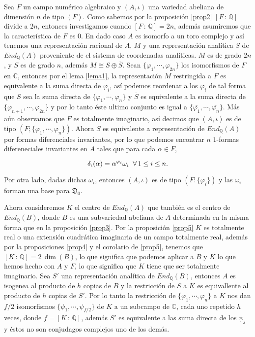 \documentclass[letterpaper]{report}
\newcommand{\rac}{\ensuremath{ \mathbb Q }}
\newcommand{\co}{\ensuremath{\mathbb C }}
\begin{document}
Sea $F$ un campo numérico algebraico y $(A,\iota)$ una variedad abeliana de dimensión $n$ de tipo $(F)$. Como sabemos por la proposición \ref{prop2} $[F\,:\,\rac]$ divide a $2n$, entonces investigamos cuando $[F\,:\,\rac]=2n$, además asumiremos que la característica de $F$ es $0$. En dado caso $A$ es isomorfo a un toro complejo y así tenemos una representación racional de $A$, $M$ y una representación analítica $S$ de $End_{\rac}(A)$ proveniente de el sistema de coordenadas analíticas. $M$ es de grado $2n$, y $S$ es de grado $n$, además $M\cong S\oplus\overline{S}$.
Sean \hbox{$\lbrace\varphi_1,\cdots,\varphi_{2n}\rbrace$} los isomorfismos de $F$ en $\co$, entonces por el lema \ref{lema1}, la representación $M$ restringida a $F$ es equivalente a la suma directa de $\varphi_i$, así podemos reordenar a los $\varphi_i$ de tal forma que $S$ sea la suma directa de \hbox{$\lbrace\varphi_1,\cdots,\varphi_{n}\rbrace$} y $\overline{S}$ es equivalente a la suma directa de \hbox{$\lbrace\varphi_{n+1},\cdots,\varphi_{2n}\rbrace$} y por lo tanto éste ultimo conjunto es igual a \hbox{$\lbrace\overline{\varphi_1},\cdots,\overline{\varphi_{n}}\rbrace$}. Más aún observamos que $F$ es totalmente imaginario, así decimos que $(A,\iota)$ es de tipo \hbox{$(F; \lbrace\varphi_1,\cdots,\varphi_{n}\rbrace)$}. Ahora $S$ es equivalente a representación de $End_{\rac}(A)$ por formas diferenciales invariantes, por lo que podemos encontrar $n$ $1$-formas difereneciales invariantes en $A$ tales que para cada $\alpha\in F$,

$$\delta_{\iota}(\alpha)=\alpha^{\varphi_i}\omega_i\hspace{0.2cm}\forall\,1\leq i\leq n.$$

Por otra lado, dadas dichas $\omega_i$, entonces $(A,\iota)$ es de tipo $(F:\lbrace \varphi_i\rbrace)$ y las $\omega_i$ forman una base para $\mathfrak{D}_0$.

Ahora consideremos $K$ el centro de $End_{\rac}(A)$ que también es el centro de $End_{\rac}(B)$, donde $B$ es una subvariedad abeliana de $A$ determinada en la misma forma que en la proposición \ref{prop3}. Por la proposición \ref{prop5} $K$ es totalmente real o una extensión cuadrática imaginaria de un campo totalmente real, además  por la proposiciones \ref{prop4} y el corolario de \ref{prop5}, tenemos que $[K\,:\,\rac]=2\, \dim(B)$, lo que significa que podemos aplicar a $B$ y $K$ lo que hemos hecho con  $A$ y $F$, lo que significa que $K$ tiene que ser totalmente imaginario. Sea $S'$ una representación analítica de $End_{\rac}(B)$, entonces $A$ es isogenea al producto de $h$ copias de $B$ y la restricción de $S$ a $K$ es equivallente al producto de $h$ copias de $S'$. Por lo tanto la restricción de \hbox{$\lbrace\varphi_1,\cdots,\varphi_{n}\rbrace$} a $K$ nos dan $f/2$ isomorfismos  \hbox{$\lbrace\psi_1,\cdots,\psi_{f/2}\rbrace$} de $K$ a un subcampo de $\co$, cada uno repetido $h$ veces, donde $f=[K\,:\,\rac]$, además $S'$ es equivalente a las suma directa de los $\psi_j$ y éstos no son conjudagos complejos uno de los demás.
\end{document}
